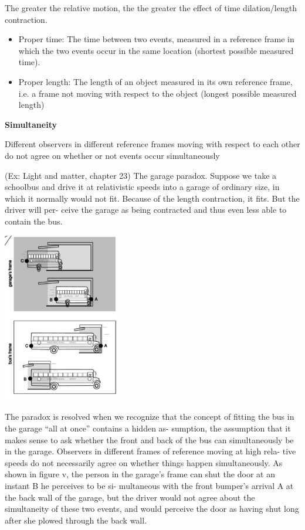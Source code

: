 \documentclass[12pt]{article}
\begin{document}
The greater the relative motion, the the greater the effect of time dilation/length contraction. 
\begin{itemize}
	\item Proper time: The time between two events, measured in a reference frame in which the two events occur in the same location (shortest possible measured time).
	\item Proper length: The length of an object measured in its own reference frame, i.e. a frame not moving with respect to the object (longest possible measured length)
\end{itemize}

\textbf{Simultaneity}

Different observers in different reference frames moving with respect to each other do not agree on whether or not events occur simultaneously

(Ex: Light and matter, chapter 23) The garage paradox. Suppose we take a schoolbus and drive it at relativistic speeds
into a garage of ordinary size, in which it normally would not fit.
Because of the length contraction, it fits. But the driver will per-
ceive the garage as being contracted and thus even less able to
contain the bus.
\begin{center}
\includegraphics[width=2in]{../images/buses.png}
\end{center}
The paradox is resolved when we recognize that the concept of
fitting the bus in the garage “all at once” contains a hidden as-
sumption, the assumption that it makes sense to ask whether the
front and back of the bus can simultaneously be in the garage.
Observers in different frames of reference moving at high rela-
tive speeds do not necessarily agree on whether things happen
simultaneously. As shown in figure v, the person in the garage’s
frame can shut the door at an instant B he perceives to be si-
multaneous with the front bumper’s arrival A at the back wall of
the garage, but the driver would not agree about the simultaneity
of these two events, and would perceive the door as having shut
long after she plowed through the back wall.
\end{document}
